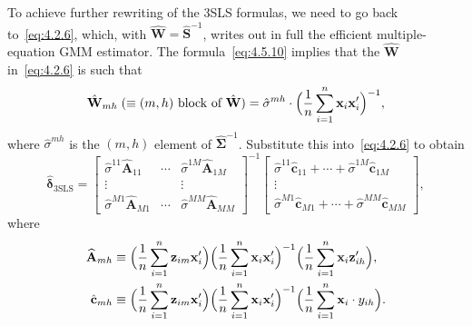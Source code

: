 To achieve further rewriting of the 3SLS formulas, we need to go back to~\eqref{eq:4.2.6},
which, with $\hat{\mathbf{W}} = \widehat{\mathbf{S}}^{-1}$, writes out in full the
efficient multiple-equation GMM estimator. The formula~\eqref{eq:4.5.10} implies
that the $\hat{\mathbf{W}}$ in~\eqref{eq:4.2.6} is such that
\begin{equation}
\hat{\mathbf{W}}_{mh}
\;(\equiv (m,h) \text{ block of } \hat{\mathbf{W}})
= \hat{\sigma}^{mh} \cdot \Bigl(\frac{1}{n} \sum_{i=1}^{n}
\mathbf{x}_i \mathbf{x}_i'\Bigr)^{-1},
\label{eq:4.5.11}
\end{equation}
where $\hat{\sigma}^{mh}$ is the $(m,h)$ element of
$\widehat{\boldsymbol{\Sigma}}^{-1}$.
Substitute this into~\eqref{eq:4.2.6} to obtain
\begin{equation}
\hat{\boldsymbol{\delta}}_{\mathrm{3SLS}}
= \begin{bmatrix}
\hat{\sigma}^{11} \widehat{\mathbf{A}}_{11} & \cdots &
\hat{\sigma}^{1M} \widehat{\mathbf{A}}_{1M} \\
\vdots & & \vdots \\
\hat{\sigma}^{M1} \widehat{\mathbf{A}}_{M1} & \cdots &
\hat{\sigma}^{MM} \widehat{\mathbf{A}}_{MM}
\end{bmatrix}^{-1}
\begin{bmatrix}
\hat{\sigma}^{11} \hat{\mathbf{c}}_{11} + \cdots + \hat{\sigma}^{1M} \hat{\mathbf{c}}_{1M} \\
\vdots \\
\hat{\sigma}^{M1} \hat{\mathbf{c}}_{M1} + \cdots + \hat{\sigma}^{MM} \hat{\mathbf{c}}_{MM}
\end{bmatrix},
\label{eq:4.5.12}
\end{equation}
where
\begin{align}
\widehat{\mathbf{A}}_{mh}
&\equiv \Bigl(\frac{1}{n} \sum_{i=1}^{n} \mathbf{z}_{im} \mathbf{x}_i'\Bigr)
\Bigl(\frac{1}{n} \sum_{i=1}^{n} \mathbf{x}_i \mathbf{x}_i'\Bigr)^{-1}
\Bigl(\frac{1}{n} \sum_{i=1}^{n} \mathbf{x}_i \mathbf{z}_{ih}'\Bigr),
\label{eq:4.5.13} \\
\hat{\mathbf{c}}_{mh}
&\equiv \Bigl(\frac{1}{n} \sum_{i=1}^{n} \mathbf{z}_{im} \mathbf{x}_i'\Bigr)
\Bigl(\frac{1}{n} \sum_{i=1}^{n} \mathbf{x}_i \mathbf{x}_i'\Bigr)^{-1}
\Bigl(\frac{1}{n} \sum_{i=1}^{n} \mathbf{x}_i \cdot y_{ih}\Bigr).
\label{eq:4.5.14}
\end{align}

